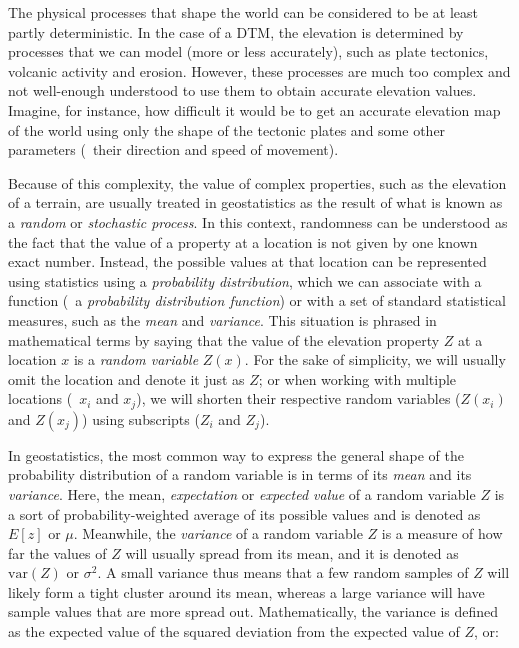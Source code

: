 The physical processes that shape the world can be considered to be at least partly deterministic.
In the case of a DTM, the elevation is determined by processes that we can model (more or less accurately), such as plate tectonics, volcanic activity and erosion.
However, these processes are much too complex and not well-enough understood to use them to obtain accurate elevation values.
Imagine, for instance, how difficult it would be to get an accurate elevation map of the world using only the shape of the tectonic plates and some other parameters (\eg\ their direction and speed of movement).

Because of this complexity, the value of complex properties, such as the elevation of a terrain, are usually treated in geostatistics as the result of what is known as a \emph{random} or \emph{stochastic process}.
In this context, randomness can be understood as the fact that the value of a property at a location is not given by one known exact number.
Instead, the possible values at that location can be represented using statistics using a \emph{probability distribution}, which we can associate with a function (\ie\ a \emph{probability distribution function}) or with a set of standard statistical measures, such as the \emph{mean} and \emph{variance}.
This situation is phrased in mathematical terms by saying that the value of the elevation property \(Z\) at a location \(x\) is a \emph{random variable} \(Z(x)\).
For the sake of simplicity, we will usually omit the location and denote it just as \(Z\); or when working with multiple locations (\eg\ \(x_i\) and \(x_j\)), we will shorten their respective random variables (\(Z(x_i)\) and \(Z(x_j)\)) using subscripts (\(Z_i\) and \(Z_j\)).

In geostatistics, the most common way to express the general shape of the probability distribution of a random variable is in terms of its \emph{mean} and its \emph{variance}.
Here, the mean, \emph{expectation} or \emph{expected value} of a random variable \(Z\) is a sort of probability-weighted average of its possible values and is denoted as \(E[z]\) or \(\mu\).
Meanwhile, the \emph{variance} of a random variable \(Z\) is a measure of how far the values of \(Z\) will usually spread from its mean, and it is denoted as \(\mathrm{var}(Z)\) or \(\sigma^2\).
A small variance thus means that a few random samples of \(Z\) will likely form a tight cluster around its mean, whereas a large variance will have sample values that are more spread out.
Mathematically, the variance is defined as the expected value of the squared deviation from the expected value of \(Z\), or:

